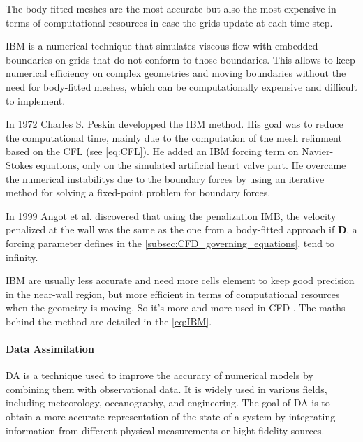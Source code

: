The body-fitted meshes are the most accurate but also the most expensive in terms of computational resources in case the grids update at each time step.

IBM is a numerical technique that simulates viscous flow with embedded boundaries on grids that do not conform to those boundaries. This allows to keep numerical efficiency on complex geometries and moving boundaries without the need for body-fitted meshes, which can be computationally expensive and difficult to implement.

In 1972 Charles S. Peskin\cite{IBM_base} developped the IBM method. His goal was to reduce the computational time, mainly due to the computation of the mesh refinment based on the \ac{CFL} (see \autoref{eq:CFL}). He added an IBM forcing term on Navier-Stokes equations, only on the simulated artificial heart valve part. He overcame the numerical instabilitys due to the boundary forces by using an iterative method for solving a fixed-point problem for boundary forces.

In 1999 Angot et al. \cite{angotPenalizationMethodTake1999a} discovered that using the penalization IMB, the velocity penalized at the wall was the same as the one from a body-fitted approach if $\mathbf{D}$, a forcing parameter defines in the \autoref{subsec:CFD_governing_equations}, tend to infinity.

IBM are usually less accurate and need more cells element to keep good precision in the near-wall region, but more efficient in terms of computational resources when the geometry is moving. So it's more and more used in CFD \cite{annurev:/content/journals/10.1146/annurev-fluid-120720-022129}. The maths behind the method are detailed in the \autoref{eq:IBM}.


\paragraph{Data Assimilation} \ac{DA} is a technique used to improve the accuracy of numerical models by combining them with observational data\cite{aschDataAssimilationMethods2016}. It is widely used in various fields, including meteorology, oceanography, and engineering. The goal of DA is to obtain a more accurate representation of the state of a system by integrating information from different physical measurements or hight-fidelity sources.


